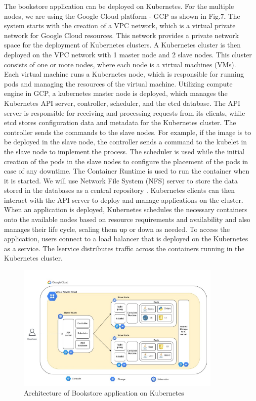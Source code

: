 The bookstore application can be deployed on Kubernetes. For the multiple nodes, we are using the Google Cloud platform - GCP as shown in Fig.7. The system starts with the creation of a VPC network, which is a virtual private network for Google Cloud resources. This network provides a private network space for the deployment of Kubernetes clusters. A Kubernetes cluster is then deployed on the VPC network with 1 master node and 2 slave nodes. This cluster consists of one or more nodes, where each node is a virtual machines (VMs). Each virtual machine runs a Kubernetes node, which is responsible for running pods and managing the resources of the virtual machine. Utilizing compute engine in GCP, a kubernetes master node is  deployed, which manages the Kubernetes API server, controller, scheduler, and the etcd database. The API server is responsible for receiving and processing requests from its clients, while etcd stores configuration data and metadata for the Kubernetes cluster. The controller sends the commands to the slave nodes.  For example, if the image is to be deployed in the slave node, the controller sends a command to the kubelet in the slave node to implement the process. The scheduler is used while the initial creation of the pods in the slave nodes to configure the placement of the pods in case of any downtime. The Container Runtime is used to run the container when it is started. We will use Network File System (NFS) server to store the data stored in the databases as a central repository . Kubernetes clients can then interact with the API server to deploy and manage applications on the cluster. When an application is deployed, Kubernetes schedules the necessary containers onto the available nodes based on resource requirements and availability and also manages their life cycle, scaling them up or down as needed. To access the application, users connect to a load balancer that is deployed on the Kubernetes  as a service. The lservice distributes traffic across the containers running in the Kubernetes cluster.

\begin{figure}
    \centering
    \includegraphics[width=10cm, height=6.2cm]{images/Kubernetes_architecture.jpg}
    \caption{Architecture of Bookstore application on Kubernetes}
    \label{fig:my_label}
\end{figure}
